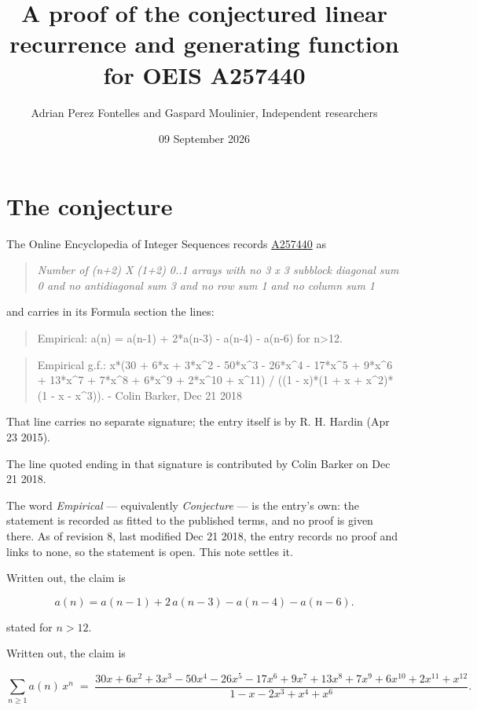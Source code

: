 \documentclass[11pt]{article}
\title{A proof of the conjectured linear recurrence and generating function for OEIS A257440}
\author{Adrian Perez Fontelles and Gaspard Moulinier, Independent researchers}
\date{09 September 2026}
\theoremstyle{definition}
\begin{document}
\maketitle
\section{The conjecture}

The Online Encyclopedia of Integer Sequences records \href{https://oeis.org/A257440}{A257440} as

\begin{quote}\itshape Number of (n+2) X (1+2) 0..1 arrays with no 3 x 3 subblock diagonal sum 0 and no antidiagonal sum 3 and no row sum 1 and no column sum 1\end{quote}

and carries in its Formula section the lines:

\begin{quote}\ttfamily Empirical: a(n) = a(n-1) + 2*a(n-3) - a(n-4) - a(n-6) for n>12.\end{quote}

\begin{quote}\ttfamily Empirical g.f.: x*(30 + 6*x + 3*x\textasciicircum{}2 - 50*x\textasciicircum{}3 - 26*x\textasciicircum{}4 - 17*x\textasciicircum{}5 + 9*x\textasciicircum{}6 + 13*x\textasciicircum{}7 + 7*x\textasciicircum{}8 + 6*x\textasciicircum{}9 + 2*x\textasciicircum{}10 + x\textasciicircum{}11) / ((1 - x)*(1 + x + x\textasciicircum{}2)*(1 - x - x\textasciicircum{}3)). - Colin Barker, Dec 21 2018\end{quote}

That line carries no separate signature; the entry itself is by R. H. Hardin (Apr 23 2015).

The line quoted ending in that signature is contributed by Colin Barker on Dec 21 2018.

The word {\itshape Empirical} --- equivalently {\itshape Conjecture} --- is the entry's own: the statement is recorded as fitted to the published terms, and no proof is given there. As of revision 8, last modified Dec 21 2018, the entry records no proof and links to none, so the statement is open. This note settles it.

Written out, the claim is

\[a(n) = a(n-1) + 2\,a(n-3) - a(n-4) - a(n-6).\]

stated for $n > 12$.

Written out, the claim is

\[\sum_{n \ge 1} a(n)\,x^n \;=\; \frac{30x + 6x^{2} + 3x^{3} - 50x^{4} - 26x^{5} - 17x^{6} + 9x^{7} + 13x^{8} + 7x^{9} + 6x^{10} + 2x^{11} + x^{12}}{1 - x - 2x^{3} + x^{4} + x^{6}}.\]
\end{document}
